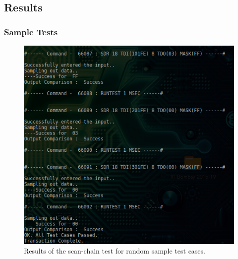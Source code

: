 \documentclass[a4paper, 11pt]{article}
\begin{document}
\subsection*{Results}
\subsubsection*{Sample Tests}
\begin{figure}[H]
\centering
\includegraphics[scale=0.66]{Complete_Test}
\caption{Results of the scan-chain test for random sample test cases.}
\end{figure}
\end{document}
